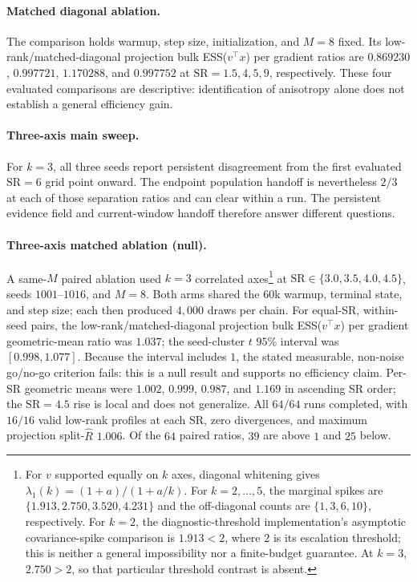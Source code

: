 \documentclass[11pt]{article}
\theoremstyle{plain}
\theoremstyle{definition}
\theoremstyle{remark}
\newcommand{\Rhat}{\widehat R}
\begin{document}
\paragraph{Matched diagonal ablation.}
The comparison holds warmup, step size, initialization, and $M=8$ fixed. Its
low-rank/matched-diagonal projection bulk ESS($v^\top x$) per gradient ratios
are $0.869230$, $0.997721$, $1.170288$, and $0.997752$ at
$\mathrm{SR}=1.5,4,5,9$, respectively. These four evaluated comparisons are
descriptive: identification of anisotropy alone does not establish a general
efficiency gain.

\paragraph{Three-axis main sweep.}
For $k=3$, all three seeds report persistent disagreement from the first
evaluated $\mathrm{SR}=6$ grid point onward. The endpoint population handoff is
nevertheless $2/3$ at each of those separation ratios and can clear within a
run. The persistent evidence field and current-window handoff therefore answer
different questions.

\paragraph{Three-axis matched ablation (null).}
A same-$M$ paired ablation used $k=3$ correlated axes\footnote{For
$v$ supported equally on $k$ axes, diagonal whitening gives
$\lambda_1(k)=(1+a)/(1+a/k)$. For $k=2,\ldots,5$, the marginal spikes are
$\{1.913,2.750,3.520,4.231\}$ and the off-diagonal counts are
$\{1,3,6,10\}$, respectively. For $k=2$, the diagnostic-threshold implementation's
asymptotic covariance-spike comparison is $1.913<2$, where $2$ is its
escalation threshold; this is neither a general impossibility nor a
finite-budget guarantee. At $k=3$, $2.750>2$, so that particular threshold
contrast is absent.} at
$\mathrm{SR}\in\{3.0,3.5,4.0,4.5\}$, seeds $1001$--$1016$, and $M=8$.
Both arms shared the $60$k warmup, terminal state, and step size; each then
produced $4{,}000$ draws per chain. For equal-SR, within-seed pairs, the
low-rank/matched-diagonal projection bulk ESS($v^\top x$) per gradient
geometric-mean ratio was $1.037$; the seed-cluster $t$ $95\%$ interval was
$[0.998,1.077]$. Because the interval includes $1$, the stated
measurable, non-noise go/no-go criterion fails: this is a null result and
supports no efficiency claim. Per-SR geometric means were $1.002$,
$0.999$, $0.987$, and $1.169$ in ascending SR order; the
$\mathrm{SR}=4.5$ rise is local and does not generalize. All $64/64$ runs
completed, with $16/16$ valid low-rank profiles at each SR, zero divergences,
and maximum projection split-$\Rhat$ $1.006$. Of the $64$ paired ratios,
$39$ are above $1$ and $25$ below.
\end{document}
